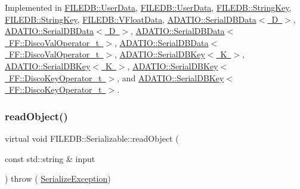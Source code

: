 Implemented in \mbox{\hyperlink{classFILEDB_1_1UserData_a61ccded861bac4b772af2488a2cc7605}{F\+I\+L\+E\+D\+B\+::\+User\+Data}}, \mbox{\hyperlink{classFILEDB_1_1UserData_a61ccded861bac4b772af2488a2cc7605}{F\+I\+L\+E\+D\+B\+::\+User\+Data}}, \mbox{\hyperlink{classFILEDB_1_1StringKey_a25cefb184c88bc5bf871245e82ea21f9}{F\+I\+L\+E\+D\+B\+::\+String\+Key}}, \mbox{\hyperlink{classFILEDB_1_1StringKey_a25cefb184c88bc5bf871245e82ea21f9}{F\+I\+L\+E\+D\+B\+::\+String\+Key}}, \mbox{\hyperlink{classFILEDB_1_1VFloatData_ae217975cba234df3601c065669f26f38}{F\+I\+L\+E\+D\+B\+::\+V\+Float\+Data}}, \mbox{\hyperlink{classADATIO_1_1SerialDBData_a2f7405b96f413b1787fc2072b8932c20}{A\+D\+A\+T\+I\+O\+::\+Serial\+D\+B\+Data$<$ D $>$}}, \mbox{\hyperlink{classADATIO_1_1SerialDBData_a2f7405b96f413b1787fc2072b8932c20}{A\+D\+A\+T\+I\+O\+::\+Serial\+D\+B\+Data$<$ D $>$}}, \mbox{\hyperlink{classADATIO_1_1SerialDBData_a2f7405b96f413b1787fc2072b8932c20}{A\+D\+A\+T\+I\+O\+::\+Serial\+D\+B\+Data$<$ F\+F\+::\+Disco\+Val\+Operator\+\_\+t $>$}}, \mbox{\hyperlink{classADATIO_1_1SerialDBData_a2f7405b96f413b1787fc2072b8932c20}{A\+D\+A\+T\+I\+O\+::\+Serial\+D\+B\+Data$<$ F\+F\+::\+Disco\+Val\+Operator\+\_\+t $>$}}, \mbox{\hyperlink{classADATIO_1_1SerialDBKey_a10b5c24f2529bac1df4c4603c2caf551}{A\+D\+A\+T\+I\+O\+::\+Serial\+D\+B\+Key$<$ K $>$}}, \mbox{\hyperlink{classADATIO_1_1SerialDBKey_a10b5c24f2529bac1df4c4603c2caf551}{A\+D\+A\+T\+I\+O\+::\+Serial\+D\+B\+Key$<$ K $>$}}, \mbox{\hyperlink{classADATIO_1_1SerialDBKey_a10b5c24f2529bac1df4c4603c2caf551}{A\+D\+A\+T\+I\+O\+::\+Serial\+D\+B\+Key$<$ F\+F\+::\+Disco\+Key\+Operator\+\_\+t $>$}}, and \mbox{\hyperlink{classADATIO_1_1SerialDBKey_a10b5c24f2529bac1df4c4603c2caf551}{A\+D\+A\+T\+I\+O\+::\+Serial\+D\+B\+Key$<$ F\+F\+::\+Disco\+Key\+Operator\+\_\+t $>$}}.

\mbox{\label{classFILEDB_1_1Serializable_a21a5831fa4f65790490a8a5eba9fcab2}} 
\subsubsection{\texorpdfstring{readObject()}{readObject()}\hspace{0.1cm}{\footnotesize\ttfamily [2/2]}}
{\footnotesize\ttfamily virtual void F\+I\+L\+E\+D\+B\+::\+Serializable\+::read\+Object (\begin{DoxyParamCaption}\item[{const std\+::string \&}]{input }\end{DoxyParamCaption}) throw ( \mbox{\hyperlink{classFILEDB_1_1SerializeException}{Serialize\+Exception}}) \hspace{0.3cm}{\ttfamily [pure virtual]}}

